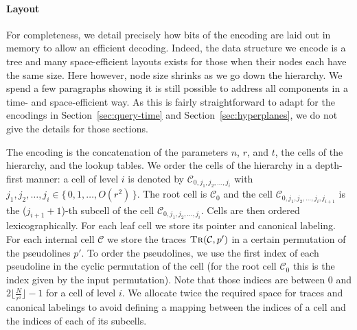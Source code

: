 \paragraph*{Layout}
For completeness, we detail precisely how bits of the encoding are
laid out in memory to allow an efficient decoding.
%
Indeed, the data structure we encode is a tree and many space-efficient layouts
exists for those when their nodes each have the same size. Here however, node
size shrinks as we go down the hierarchy.
We spend a few paragraphs showing it
is still possible to
address all components in a
time- and space-efficient way.
%
As this is fairly straightforward to adapt for the encodings in
Section~\ref{sec:query-time} and Section~\ref{sec:hyperplanes},
we do not give the details for those sections.
%


The encoding is the concatenation of
the parameters \(n\), \(r\), and \( t\),
the cells of the hierarchy,
and
the lookup tables.
%
We order the cells of the hierarchy in a depth-first manner: a cell of level
\(i\) is denoted by \(\mathcal{C}_{0, j_1, j_2, \ldots, j_i}\)
with \(j_1, j_2, \ldots, j_i \in \{\, 0, 1, \ldots, O(r^2)\,\}\).
The root cell is
\(\mathcal{C}_0\) and the cell \(\mathcal{C}_{0, j_1, j_2, \ldots, j_i, j_{i+1}}\) is
the (\(j_{i+1} + 1\))-th subcell of the cell
\(\mathcal{C}_{0, j_1, j_2, \ldots, j_i}\).
%
Cells are then ordered lexicographically.
%
For each leaf cell we store its pointer and canonical labeling.
%
For each internal cell \(\mathcal{C}\) we store the traces
\(\textsc{Tr}(\mathcal{C}, p')\) in a certain permutation of the pseudolines
\(p'\).
%
To order the pseudolines, we use the first index of each pseudoline
in the cyclic permutation of the cell (for the root cell \(\mathcal{C}_0\) this
is the index given by the input permutation).
%
Note that those indices are between \(0\) and \(2 \lfloor \frac{N}{r^{i}}
\rfloor - 1\) for a cell of level \(i\). We allocate twice the required space
for traces and canonical labelings to avoid defining a mapping between the
indices of a cell and the indices of each of its subcells.


